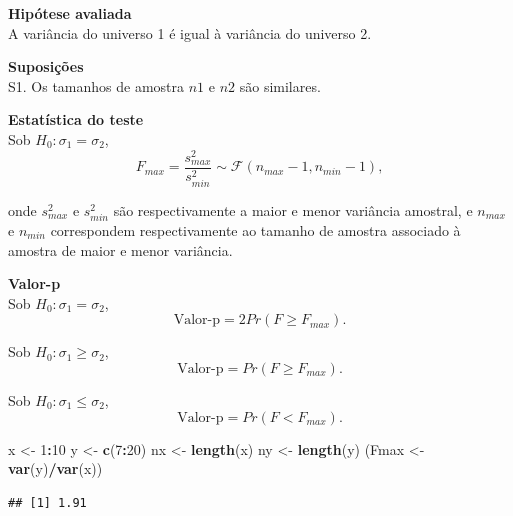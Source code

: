 \documentclass[
]{book}
\newenvironment{Shaded}{\begin{snugshade}}{\end{snugshade}}
\newcommand{\DecValTok}[1]{\textcolor[rgb]{0.00,0.00,0.81}{#1}}
\newcommand{\KeywordTok}[1]{\textcolor[rgb]{0.13,0.29,0.53}{\textbf{#1}}}
\newcommand{\NormalTok}[1]{#1}
\newcommand{\OperatorTok}[1]{\textcolor[rgb]{0.81,0.36,0.00}{\textbf{#1}}}
\newcommand{\StringTok}[1]{\textcolor[rgb]{0.31,0.60,0.02}{#1}}
\theoremstyle{definition}
\theoremstyle{definition}
\theoremstyle{definition}
\theoremstyle{remark}
\begin{document}
\textbf{Hipótese avaliada}\\
A variância do universo 1 é igual à variância do universo 2.

\textbf{Suposições}\\
S1. Os tamanhos de amostra \(n1\) e \(n2\) são similares.

\textbf{Estatística do teste}\\
Sob \(H_0: \sigma_1=\sigma_2\),
\begin{equation}
F_{max}=\frac{s_{max}^2}{s_{min}^2} \sim \mathcal{F}(n_{max}-1,n_{min}-1),
\label{eq:f-teste-var-bi}
\end{equation}

onde \(s_{max}^2\) e \(s_{min}^2\) são respectivamente a maior e menor variância amostral, e \(n_{max}\) e \(n_{min}\) correspondem respectivamente ao tamanho de amostra associado à amostra de maior e menor variância.

\textbf{Valor-p}\\
Sob \(H_0: \sigma_1=\sigma_2\),
\begin{equation}
\text{Valor-p} = 2Pr(F \ge F_{max}).
\label{eq:f-teste-var-bi-p-bi}
\end{equation}

Sob \(H_0: \sigma_1 \ge \sigma_2\),
\begin{equation}
\text{Valor-p} = Pr(F \ge F_{max}).
\label{eq:f-teste-var-bi-p-uni-inf}
\end{equation}

Sob \(H_0: \sigma_1 \le \sigma_2\),
\begin{equation}
\text{Valor-p} = Pr(F < F_{max}).
\label{eq:f-teste-var-bi-p-uni-sup}
\end{equation}

\begin{Shaded}
\begin{Highlighting}[]
\NormalTok{x \textless{}{-}}\StringTok{ }\DecValTok{1}\OperatorTok{:}\DecValTok{10}
\NormalTok{y \textless{}{-}}\StringTok{ }\KeywordTok{c}\NormalTok{(}\DecValTok{7}\OperatorTok{:}\DecValTok{20}\NormalTok{)}
\NormalTok{nx \textless{}{-}}\StringTok{ }\KeywordTok{length}\NormalTok{(x)}
\NormalTok{ny \textless{}{-}}\StringTok{ }\KeywordTok{length}\NormalTok{(y)}
\NormalTok{(Fmax \textless{}{-}}\StringTok{ }\KeywordTok{var}\NormalTok{(y)}\OperatorTok{/}\KeywordTok{var}\NormalTok{(x))}
\end{Highlighting}
\end{Shaded}

\begin{verbatim}
## [1] 1.91
\end{verbatim}
\end{document}
